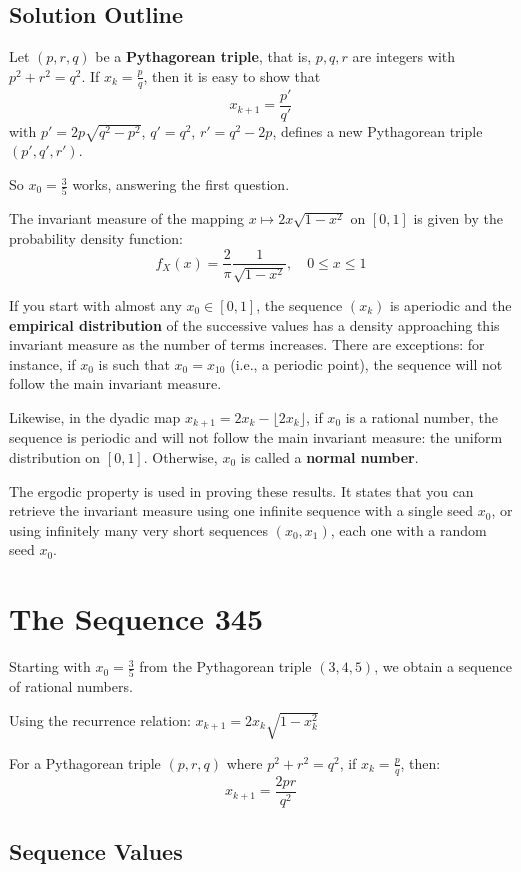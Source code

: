 \documentclass[12pt,a4paper]{article}
\begin{document}
\subsection{Solution Outline}

Let $(p, r, q)$ be a \textbf{Pythagorean triple}, that is, $p, q, r$ are integers with $p^2 + r^2 = q^2$. If $x_k = \frac{p}{q}$, then it is easy to show that
\[
x_{k+1} = \frac{p'}{q'}
\]
with $p' = 2p\sqrt{q^2 - p^2}$, $q' = q^2$, $r' = q^2 - 2p$, defines a new Pythagorean triple $(p', q', r')$. 

So $x_0 = \frac{3}{5}$ works, answering the first question.

The invariant measure of the mapping $x \mapsto 2x\sqrt{1-x^2}$ on $[0, 1]$ is given by the probability density function:
\[
f_X(x) = \frac{2}{\pi}\frac{1}{\sqrt{1-x^2}}, \quad 0 \leq x \leq 1
\]

If you start with almost any $x_0 \in [0,1]$, the sequence $(x_k)$ is aperiodic and the \textbf{empirical distribution} of the successive values has a density approaching this invariant measure as the number of terms increases. There are exceptions: for instance, if $x_0$ is such that $x_0 = x_{10}$ (i.e., a periodic point), the sequence will not follow the main invariant measure.

Likewise, in the dyadic map $x_{k+1} = 2x_k - \lfloor 2x_k \rfloor$, if $x_0$ is a rational number, the sequence is periodic and will not follow the main invariant measure: the uniform distribution on $[0,1]$. Otherwise, $x_0$ is called a \textbf{normal number}.

The ergodic property is used in proving these results. It states that you can retrieve the invariant measure using one infinite sequence with a single seed $x_0$, or using infinitely many very short sequences $(x_0, x_1)$, each one with a random seed $x_0$.

\section{The Sequence 345}

Starting with $x_0 = \frac{3}{5}$ from the Pythagorean triple $(3, 4, 5)$, we obtain a sequence of rational numbers.

Using the recurrence relation: $x_{k+1} = 2x_k\sqrt{1 - x_k^2}$

For a Pythagorean triple $(p, r, q)$ where $p^2 + r^2 = q^2$, if $x_k = \frac{p}{q}$, then:
\[
x_{k+1} = \frac{2pr}{q^2}
\]

\subsection{Sequence Values}
\end{document}
